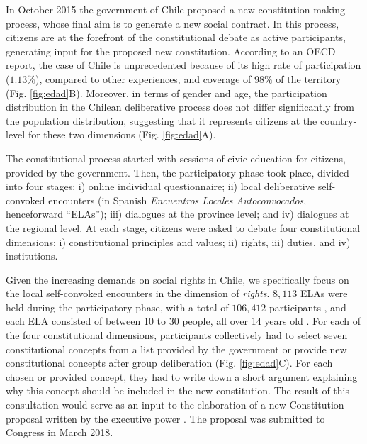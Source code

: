 \documentclass[onecolumn]{article}
\begin{document}
In October 2015 the government of Chile proposed a new constitution-making process, whose final aim is to generate a new social contract. In this process, citizens are at the forefront of the constitutional debate as active participants, generating input for the proposed new constitution. According to an OECD report,\cite{ocde} the case of Chile is unprecedented because of its high rate of participation ($1.13\%$), compared to other experiences, and coverage of $98\%$ of the territory (Fig. \ref{fig:edad}B). Moreover, in terms of gender and age, the participation distribution in the Chilean deliberative process does not differ significantly from the population distribution, suggesting that it represents citizens at the country-level for these two dimensions (Fig. \ref{fig:edad}A). 

The constitutional process started with sessions of civic education for citizens, provided by the government. Then, the participatory phase took place, divided into four stages: i) online individual questionnaire;  ii) local deliberative self-convoked encounters (in Spanish \textit{Encuentros Locales Autoconvocados}, henceforward ``ELAs''); iii) dialogues at the province level; and iv) dialogues at the regional level. At each stage, citizens were asked to debate four constitutional dimensions: i) constitutional principles and values; ii) rights, iii) duties, and iv) institutions. 

Given the increasing demands on social rights in Chile, we specifically focus on the local self-convoked encounters in the dimension of \textit{rights}. $8,113$ ELAs were held during the participatory phase, with a total of $106,412$ participants \cite{memoria}, and each ELA consisted of between 10 to 30 people, all over 14 years old \cite{guiacabildo}. For each of the four constitutional dimensions, participants collectively had to select seven constitutional concepts from a list provided by the government or provide new constitutional concepts after group deliberation (Fig. \ref{fig:edad}C). For each chosen or provided concept, they had to write down a short argument explaining why this concept should be included in the new constitution. The result of this consultation would serve as an input to the elaboration of a new Constitution proposal written by the executive power \cite{ocde}. The proposal was submitted to Congress in March 2018. 
\end{document}
